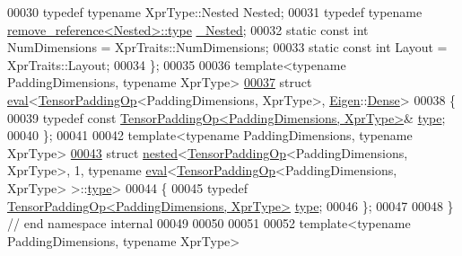 \begin{DoxyCode}
00030   \textcolor{keyword}{typedef} \textcolor{keyword}{typename} XprType::Nested Nested;
00031   \textcolor{keyword}{typedef} \textcolor{keyword}{typename} \hyperlink{group___sparse_core___module}{remove\_reference<Nested>::type} 
      \hyperlink{group___sparse_core___module}{\_Nested};
00032   \textcolor{keyword}{static} \textcolor{keyword}{const} \textcolor{keywordtype}{int} NumDimensions = XprTraits::NumDimensions;
00033   \textcolor{keyword}{static} \textcolor{keyword}{const} \textcolor{keywordtype}{int} Layout = XprTraits::Layout;
00034 \};
00035 
00036 \textcolor{keyword}{template}<\textcolor{keyword}{typename} PaddingDimensions, \textcolor{keyword}{typename} XprType>
\hyperlink{struct_eigen_1_1internal_1_1eval_3_01_tensor_padding_op_3_01_padding_dimensions_00_01_xpr_type_01_4_00_01_eigen_1_1_dense_01_4}{00037} \textcolor{keyword}{struct }\hyperlink{struct_eigen_1_1internal_1_1eval}{eval}<\hyperlink{class_eigen_1_1_tensor_padding_op}{TensorPaddingOp}<PaddingDimensions, XprType>, 
      \hyperlink{namespace_eigen}{Eigen}::\hyperlink{struct_eigen_1_1_dense}{Dense}>
00038 \{
00039   \textcolor{keyword}{typedef} \textcolor{keyword}{const} \hyperlink{class_eigen_1_1_tensor_padding_op}{TensorPaddingOp<PaddingDimensions, XprType>}& 
      \hyperlink{class_eigen_1_1_tensor_padding_op}{type};
00040 \};
00041 
00042 \textcolor{keyword}{template}<\textcolor{keyword}{typename} PaddingDimensions, \textcolor{keyword}{typename} XprType>
\hyperlink{struct_eigen_1_1internal_1_1nested_3_01_tensor_padding_op_3_01_padding_dimensions_00_01_xpr_type5274dc122ae52b0a0b0b3a8c02d9f9cb}{00043} \textcolor{keyword}{struct }\hyperlink{struct_eigen_1_1internal_1_1nested}{nested}<\hyperlink{class_eigen_1_1_tensor_padding_op}{TensorPaddingOp}<PaddingDimensions, XprType>, 1, typename 
      \hyperlink{struct_eigen_1_1internal_1_1eval}{eval}<\hyperlink{class_eigen_1_1_tensor_padding_op}{TensorPaddingOp}<PaddingDimensions, XprType> >::\hyperlink{class_eigen_1_1_tensor_padding_op}{type}>
00044 \{
00045   \textcolor{keyword}{typedef} \hyperlink{class_eigen_1_1_tensor_padding_op}{TensorPaddingOp<PaddingDimensions, XprType>} 
      \hyperlink{class_eigen_1_1_tensor_padding_op}{type};
00046 \};
00047 
00048 \}  \textcolor{comment}{// end namespace internal}
00049 
00050 
00051 
00052 \textcolor{keyword}{template}<\textcolor{keyword}{typename} PaddingDimensions, \textcolor{keyword}{typename} XprType>

\end{DoxyCode}
